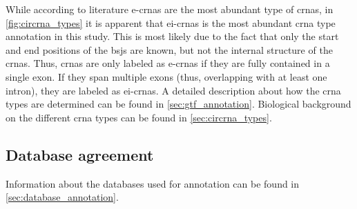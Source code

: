 While according to literature \glspl{e-crna} are the most abundant type of
\glspl{crna}, in \cref{fig:circrna_types} it is apparent that \glspl{ei-crna}
is the most abundant \gls{crna} type annotation in this study.
This is most likely due to the fact that only the start and end positions of
the \glspl{bsj} are known, but not the internal structure of the \glspl{crna}.
Thus, \glspl{crna} are only labeled as \glspl{e-crna} if they are fully
contained in a single exon.
If they span multiple exons (thus, overlapping with at least one intron), they
are labeled as \glspl{ei-crna}.
A detailed description about how the \gls{crna} types are determined can be
found in \cref{sec:gtf_annotation}.
Biological background on the different \gls{crna} types can be found in
\cref{sec:circrna_types}.

\subsection{Database agreement}

Information about the databases used for annotation can be found in
\cref{sec:database_annotation}.

